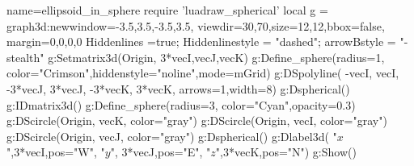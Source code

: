 \documentclass[border=5pt]{standalone}%
\begin{document}
\begin{luadraw}{name=ellipsoid_in_sphere}
require 'luadraw_spherical'
local g = graph3d:new{window={-3.5,3.5,-3.5,3.5}, viewdir={30,70},size={12,12},bbox=false, margin={0,0,0,0}} 
Hiddenlines =true; Hiddenlinestyle = "dashed"; arrowBstyle = "-stealth"
g:Setmatrix3d({Origin, 3*vecI,vecJ,vecK})
g:Define_sphere({radius=1, color="Crimson",hiddenstyle="noline",mode=mGrid})
g:DSpolyline( {{-vecI, vecI}, {-3*vecJ, 3*vecJ}, {-3*vecK, 3*vecK}}, {arrows=1,width=8})
g:Dspherical()
g:IDmatrix3d()
g:Define_sphere({radius=3, color="Cyan",opacity=0.3})
g:DScircle({Origin, vecK}, {color="gray"})
g:DScircle({Origin, vecI}, {color="gray"})
g:DScircle({Origin, vecJ}, {color="gray"})
g:Dspherical()
g:Dlabel3d( "$x$",3*vecI,{pos="W"}, "$y$", 3*vecJ,{pos="E"}, "$z$",3*vecK,{pos="N"})
g:Show()
\end{luadraw}
\end{document}
